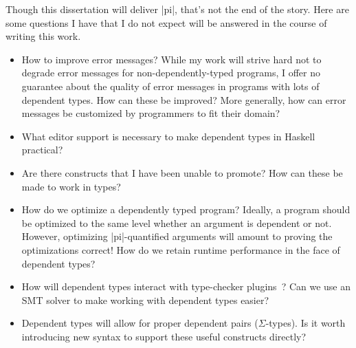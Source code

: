 \begin{proposal}
Though this dissertation will deliver |pi|, that's not the end of the story.
Here are some questions I have that I do not expect will be answered in the
course of writing this work.
\begin{itemize}
\item How to improve error messages? While my work will strive hard not to
degrade error messages for non-dependently-typed programs, I offer no
guarantee about the quality of error messages in programs with lots of
dependent types. How can these be improved? More generally, how can error
messages be customized by programmers to fit their domain?

\item What editor support is necessary to make dependent types in Haskell
practical?

\item Are there constructs that I have been unable to promote? How can these
be made to work in types?

\item How do we optimize a dependently typed program? Ideally, a program should
be optimized to the same level whether an argument is dependent or not. However,
optimizing |pi|-quantified arguments will amount to proving the optimizations
correct! How do we retain runtime performance in the face of dependent types?

\item How will dependent types interact with type-checker
  plugins~\cite{type-checker-plugins}? Can we use an SMT solver to make working
  with dependent types easier?

\item Dependent types will allow for proper dependent pairs ($\Sigma$-types).
  Is it worth introducing new syntax to support these useful constructs directly?
\end{itemize}
\end{proposal}
